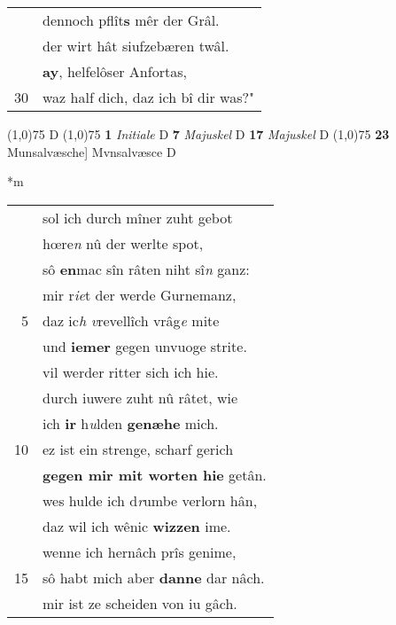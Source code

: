 \documentclass[8pt,a4paper,notitlepage]{article}
\begin{document}
\begin{table}[ht]
\begin{minipage}[t]{0.5\linewidth}
\begin{tabular}{rl}
 & dennoch pflît\textbf{s} mêr der Grâl.\\ 
 & der wirt hât siufzebæren twâl.\\ 
 & \textbf{ay}, helfelôser Anfortas,\\ 
30 & waz half dich, daz ich bî dir was?"\\ 
\end{tabular}
\scriptsize
\line(1,0){75} \newline
D \newline
\line(1,0){75} \newline
\textbf{1} \textit{Initiale} D  \textbf{7} \textit{Majuskel} D  \textbf{17} \textit{Majuskel} D  \newline
\line(1,0){75} \newline
\textbf{23} Munsalvæsche] Mvnsalvæsce D \newline
\end{minipage}
\hspace{0.5cm}
\begin{minipage}[t]{0.5\linewidth}
\small
\begin{center}*m
\end{center}
\begin{tabular}{rl}
 & sol ich durch mîner zuht gebot\\ 
 & hœre\textit{n} nû der werlte spot,\\ 
 & sô \textbf{en}mac sîn râten niht sî\textit{n} ganz:\\ 
 & mir r\textit{ie}t der werde Gurnemanz,\\ 
5 & daz ic\textit{h v}revellîch vrâg\textit{e} mite\\ 
 & und \textbf{iemer} gegen unvuoge strite.\\ 
 & vil werder ritter sich ich hie.\\ 
 & durch iuwere zuht nû râtet, wie\\ 
 & ich \textbf{ir} h\textit{u}lden \textbf{genæhe} mich.\\ 
10 & ez ist ein strenge, scharf gerich\\ 
 & \textbf{gegen mir mit worten hie} getân.\\ 
 & wes hulde ich d\textit{r}umbe verlorn hân,\\ 
 & daz wil ich wênic \textbf{wizzen} ime.\\ 
 & wenne ich hernâch prîs genime,\\ 
15 & sô habt mich aber \textbf{danne} dar nâch.\\ 
 & mir ist ze scheiden von iu gâch.\\ 

\end{tabular}
\end{minipage}
\end{table}
\end{document}
